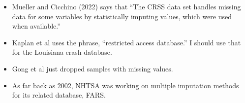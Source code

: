\begin{itemize}
	\item Mueller and Cicchino (2022) \cite{MUELLER2022305} says that  ``The CRSS data set handles missing data for some variables by statistically imputing values, which were used when available.''
	
	\item Kaplan et al \cite{KAPLAN2017130} uses the phrase, ``restricted access database.''  I should use that for the Louisiana crash database.  
	
	\item  Gong et al \cite{GONG2022100190} just dropped samples with missing values.  
	
	\item As far back as 2002, NHTSA was working on multiple imputation methods for its related database, FARS.  \cite{subramanian2002transitioning}
		
\end{itemize}
